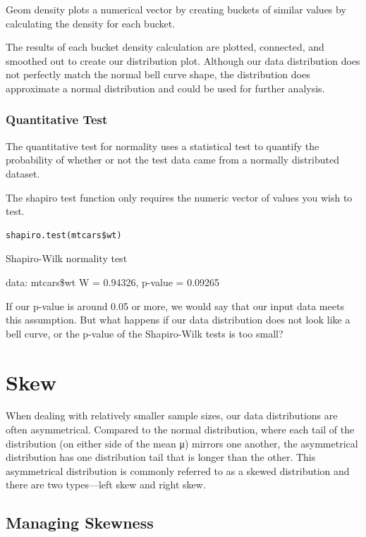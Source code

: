 \documentclass[11pt]{article}
\begin{document}
Geom density plots a numerical vector by creating buckets of similar values by calculating the density for each bucket.

The results of each bucket density calculation are plotted, connected, and smoothed out to create our distribution plot. Although our data distribution does not perfectly match the normal bell curve shape, the distribution does approximate a normal distribution and could be used for further analysis.

\subsubsection{Quantitative Test}
\label{sec:orgfc4a380}

The quantitative test for normality uses a statistical test to quantify the probability of whether or not the test data came from a normally distributed dataset.

The shapiro test function only requires the numeric vector of values you wish to test.

\begin{verbatim}
shapiro.test(mtcars$wt)
\end{verbatim}

\begin{org}


Shapiro-Wilk normality test

data:  mtcars\$wt
W = 0.94326, p-value = 0.09265
\end{org}

If our p-value is around 0.05 or more, we would say that our input data meets this assumption. But what happens if our data distribution does not look like a bell curve, or the p-value of the Shapiro-Wilk tests is too small?

\section{Skew}
\label{sec:org474f9f7}

When dealing with relatively smaller sample sizes, our data distributions are often asymmetrical. Compared to the normal distribution, where each tail of the distribution (on either side of the mean μ) mirrors one another, the asymmetrical distribution has one distribution tail that is longer than the other. This asymmetrical distribution is commonly referred to as a skewed distribution and there are two types—left skew and right skew.

\subsection{Managing Skewness}
\label{sec:orgf82ec5c}
\end{document}
